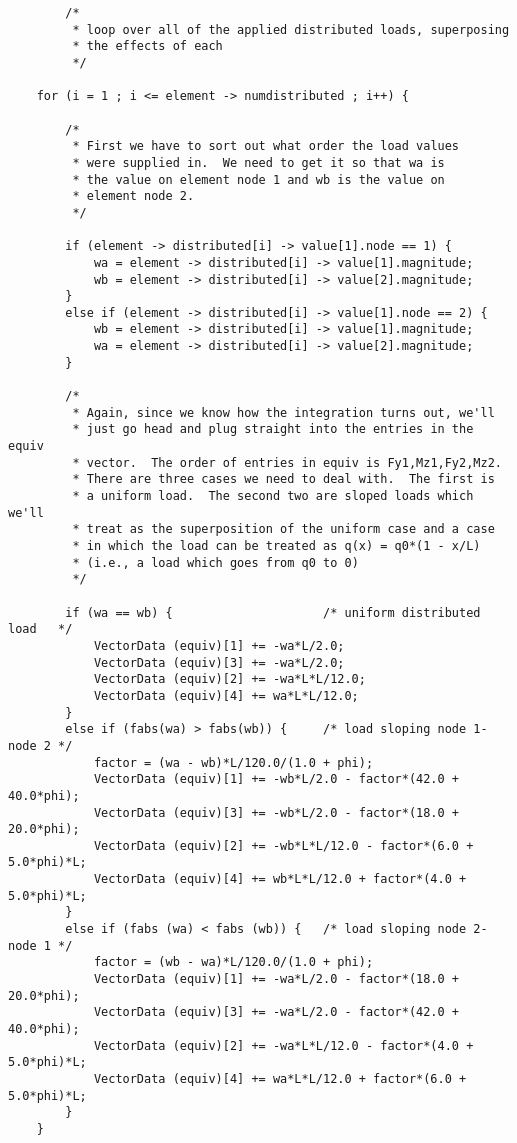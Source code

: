 {\begin{screen}
\begin{verbatim}
        /*
         * loop over all of the applied distributed loads, superposing
         * the effects of each
         */

    for (i = 1 ; i <= element -> numdistributed ; i++) {

        /*
         * First we have to sort out what order the load values
         * were supplied in.  We need to get it so that wa is
         * the value on element node 1 and wb is the value on 
         * element node 2.
         */

        if (element -> distributed[i] -> value[1].node == 1) {
            wa = element -> distributed[i] -> value[1].magnitude;
            wb = element -> distributed[i] -> value[2].magnitude;
        }
        else if (element -> distributed[i] -> value[1].node == 2) {
            wb = element -> distributed[i] -> value[1].magnitude;
            wa = element -> distributed[i] -> value[2].magnitude;
        }

        /*
         * Again, since we know how the integration turns out, we'll
         * just go head and plug straight into the entries in the equiv
         * vector.  The order of entries in equiv is Fy1,Mz1,Fy2,Mz2.
         * There are three cases we need to deal with.  The first is 
         * a uniform load.  The second two are sloped loads which we'll
         * treat as the superposition of the uniform case and a case
         * in which the load can be treated as q(x) = q0*(1 - x/L)
         * (i.e., a load which goes from q0 to 0)
         */

        if (wa == wb) {                     /* uniform distributed load   */
            VectorData (equiv)[1] += -wa*L/2.0;
            VectorData (equiv)[3] += -wa*L/2.0;
            VectorData (equiv)[2] += -wa*L*L/12.0;
            VectorData (equiv)[4] += wa*L*L/12.0;
        }
        else if (fabs(wa) > fabs(wb)) {     /* load sloping node 1-node 2 */
            factor = (wa - wb)*L/120.0/(1.0 + phi);
            VectorData (equiv)[1] += -wb*L/2.0 - factor*(42.0 + 40.0*phi);
            VectorData (equiv)[3] += -wb*L/2.0 - factor*(18.0 + 20.0*phi);
            VectorData (equiv)[2] += -wb*L*L/12.0 - factor*(6.0 + 5.0*phi)*L;
            VectorData (equiv)[4] += wb*L*L/12.0 + factor*(4.0 + 5.0*phi)*L;
        }
        else if (fabs (wa) < fabs (wb)) {   /* load sloping node 2-node 1 */
            factor = (wb - wa)*L/120.0/(1.0 + phi);
            VectorData (equiv)[1] += -wa*L/2.0 - factor*(18.0 + 20.0*phi);
            VectorData (equiv)[3] += -wa*L/2.0 - factor*(42.0 + 40.0*phi);
            VectorData (equiv)[2] += -wa*L*L/12.0 - factor*(4.0 + 5.0*phi)*L;
            VectorData (equiv)[4] += wa*L*L/12.0 + factor*(6.0 + 5.0*phi)*L;
        } 
    }


\end{verbatim}
\end{screen}}
